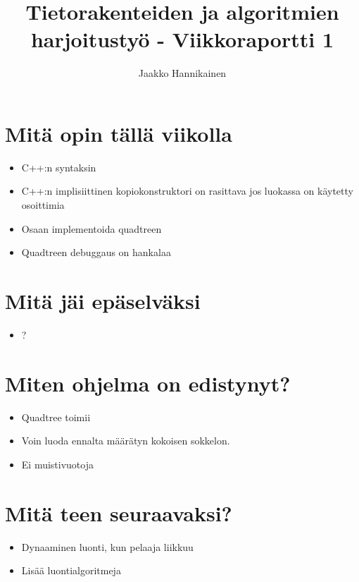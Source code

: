 \documentclass{article}
\author{Jaakko Hannikainen}
\title{Tietorakenteiden ja algoritmien harjoitustyö - Viikkoraportti 1}
\begin{document}
\maketitle

\section{Mitä opin tällä viikolla}
\begin{itemize}
    \item C++:n syntaksin
    \item C++:n implisiittinen kopiokonstruktori on rasittava jos luokassa on
        käytetty osoittimia
    \item Osaan implementoida quadtreen
    \item Quadtreen debuggaus on hankalaa
\end{itemize}

\section{Mitä jäi epäselväksi}
\begin{itemize}
    \item ?
\end{itemize}

\section{Miten ohjelma on edistynyt?}
\begin{itemize}
    \item Quadtree toimii
    \item Voin luoda ennalta määrätyn kokoisen sokkelon.
    \item Ei muistivuotoja
\end{itemize}

\section{Mitä teen seuraavaksi?}
\begin{itemize}
    \item Dynaaminen luonti, kun pelaaja liikkuu
    \item Lisää luontialgoritmeja
\end{itemize}
\end{document}
